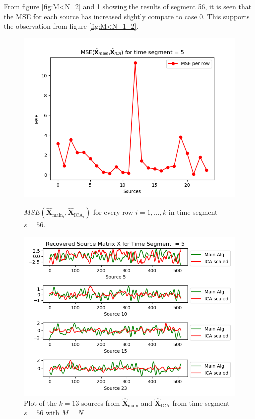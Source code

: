 \noindent 
From figure \ref{fig:M<N_2} and \ref{fig:M<N_3} showing the results of segment 56, it is seen that the MSE for each source has increased slightly compare to case 0. This supports the observation from figure \ref{fig:M<N_1_2}.      
\begin{figure}[H]
\begin{widepage}
    \begin{minipage}[t]{.45\textwidth}
\centering
\includegraphics[width=1\linewidth]{figures/ch_7/resultat/mse_third_removed_ica_timeseg5.png}
\caption{$MSE\left(\hat{\mathbf{X}}_{\text{main}_{i}},\hat{\mathbf{X}}_{\text{ICA}_{i}}\right)$ for every row $i = 1, \hdots, k$ in time segment $s=56$.}
\label{fig:M<N_2}
\end{minipage} 
\hspace{0.5cm}
\begin{minipage}[t]{.45\textwidth}
\centering
\includegraphics[width=1\linewidth]{figures/ch_7/resultat/EEG_third_removed_scaled_timeseg5S1_CClean.png}
\caption{Plot of the $k = 13$ sources from $\hat{\mathbf{X}}_{\text{main}}$ and $\hat{\mathbf{X}}_{\text{ICA}}$ from time segment $s = 56$ with $M=N$}
	\label{fig:M<N_3}
    \end{minipage}
\end{widepage}
\end{figure}
